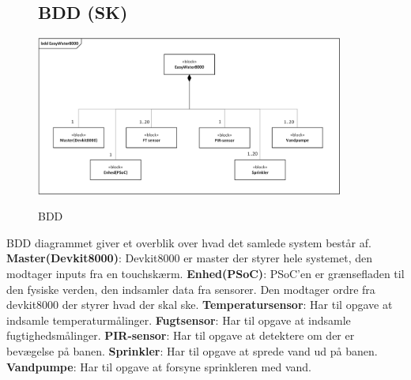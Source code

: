 \begin{figure}[H] \centering
\subsection{BDD (SK)}
{\includegraphics[width=0.9\textwidth]{filer/systemarkitektur/BDD}}
\caption{BDD}
\label{lab:bdd}
\raggedright
\end{figure}
BDD diagrammet giver et overblik over hvad det samlede system består af. \newline \newline
\textbf{Master(Devkit8000)}: Devkit8000 er master der styrer hele systemet, den modtager inputs fra en touchskærm.  \newline \newline
\textbf{Enhed(PSoC)}: PSoC'en er grænsefladen til den fysiske verden, den indsamler data fra sensorer. Den modtager ordre fra devkit8000 der styrer hvad der skal ske. 		\newline \newline
\textbf{Temperatursensor}: Har til opgave at indsamle temperaturmålinger. \newline \newline
\textbf{Fugtsensor}: Har til opgave at indsamle fugtighedsmålinger. \newline \newline
\textbf{PIR-sensor}: Har til opgave at detektere om der er bevægelse på banen. \newline \newline
\textbf{Sprinkler}: Har til opgave at sprede vand ud på banen. \newline \newline
\textbf{Vandpumpe}: Har til opgave at forsyne sprinkleren med vand. \newline \newline

